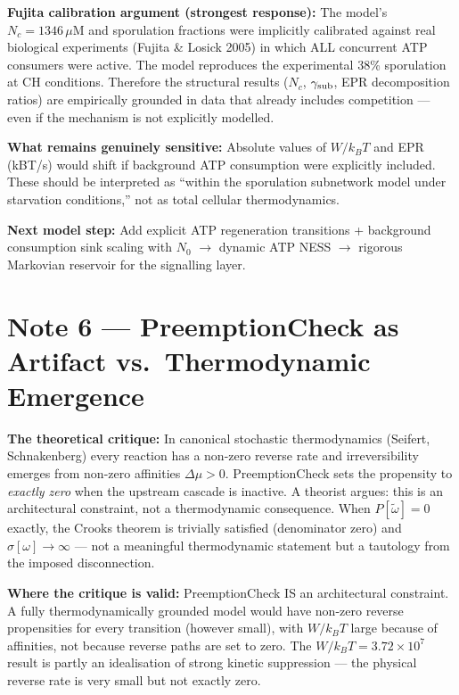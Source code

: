 \documentclass[11pt,a4paper]{article}
\begin{document}
\textbf{Fujita calibration argument (strongest response):}
The model's $N_c = 1346\,\mu$M and sporulation fractions were
implicitly calibrated against real biological experiments (Fujita \&
Losick 2005) in which ALL concurrent ATP consumers were active. The
model reproduces the experimental 38\% sporulation at CH conditions.
Therefore the structural results ($N_c$, $\gamma_{\rm sub}$, EPR
decomposition ratios) are empirically grounded in data that already
includes competition — even if the mechanism is not explicitly modelled.

\textbf{What remains genuinely sensitive:}
Absolute values of $W/k_BT$ and EPR (kBT/s) would shift if background
ATP consumption were explicitly included. These should be interpreted as
``within the sporulation subnetwork model under starvation conditions,''
not as total cellular thermodynamics.

\textbf{Next model step:}
Add explicit ATP regeneration transitions + background consumption sink
scaling with $N_0$ $\to$ dynamic ATP NESS $\to$ rigorous Markovian
reservoir for the signalling layer.

\section*{Note 6 — PreemptionCheck as Artifact vs.\ Thermodynamic Emergence}

\textbf{The theoretical critique:}
In canonical stochastic thermodynamics (Seifert, Schnakenberg) every
reaction has a non-zero reverse rate and irreversibility emerges from
non-zero affinities $\Delta\mu > 0$.
PreemptionCheck sets the propensity to \emph{exactly zero} when the
upstream cascade is inactive.
A theorist argues: this is an architectural constraint, not a thermodynamic
consequence.
When $P[\tilde\omega] = 0$ exactly, the Crooks theorem is trivially
satisfied (denominator zero) and $\sigma[\omega] \to \infty$ — not a
meaningful thermodynamic statement but a tautology from the imposed
disconnection.

\textbf{Where the critique is valid:}
PreemptionCheck IS an architectural constraint. A fully thermodynamically
grounded model would have non-zero reverse propensities for every
transition (however small), with $W/k_BT$ large because of affinities,
not because reverse paths are set to zero.
The $W/k_BT = 3.72 \times 10^7$ result is partly an idealisation of
strong kinetic suppression — the physical reverse rate is very small but
not exactly zero.
\end{document}
